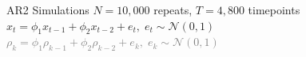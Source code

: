 \documentclass[8pt,aspectratio=169]{beamer}
\begin{document}
\begin{frame}{AR2 Simulations}
\vspace{1.5mm}
$N=10,000$ repeats, $T = 4,800$ timepoints \\ 
$x_t = \phi_1 x_{t-1} + \phi_2 x_{t-2} +e_t, \; e_t \sim \mathcal{N}(0, 1)$ \quad \textcolor{gray}{$\rho_k = \phi_1\rho_{k-1} + \phi_2\rho_{k-2} + e_k,\; e_k \sim \mathcal{N}(0, 1)$}
\vspace{1.5mm}

\centering
{}
\end{frame}
\end{document}
